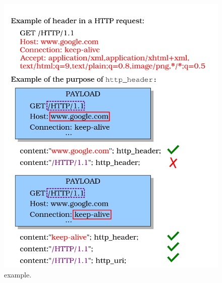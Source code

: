 \documentclass[sigconf,review, anonymous]{acmart}
\begin{document}
\begin{figure}[t!]
\centering
\includegraphics[scale=0.5]{figs/http_header-example.png}
\caption{ example.}
\label{fig:http-header-example}
\end{figure}

\end{document}
